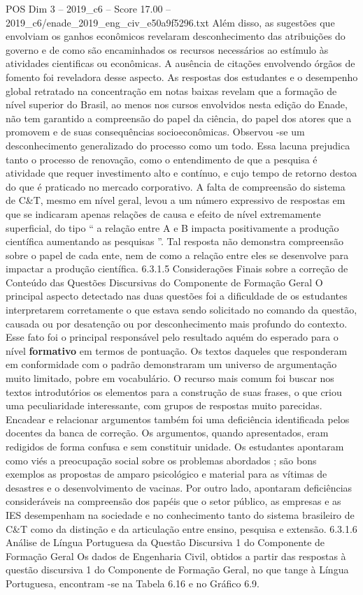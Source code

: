 \begin{textsample}{POS Dim 3 – 2019\_c6 – Score 17.00 – 2019\_c6/enade\_2019\_eng\_civ\_e50a9f5296.txt}
Além disso, as sugestões que envolviam os ganhos econômicos revelaram desconhecimento das atribuições do governo e de como são encaminhados os recursos necessários ao estímulo às atividades cientificas ou econômicas.
A ausência de citações envolvendo órgãos de fomento foi reveladora desse aspecto.
As respostas dos estudantes e o desempenho global retratado na concentração em notas baixas revelam que a formação de nível superior do Brasil, ao menos nos cursos envolvidos nesta edição do Enade, não tem garantido a compreensão do papel da ciência, do papel dos atores que a promovem e de suas consequências socioeconômicas.
Observou -se um desconhecimento generalizado do processo como um todo.
Essa lacuna prejudica tanto o processo de renovação, como o entendimento de que a pesquisa é atividade que requer investimento alto e contínuo, e cujo tempo de retorno destoa do que é praticado no mercado corporativo.
A falta de compreensão do sistema de C\&T, mesmo em nível geral, levou a um número expressivo de respostas em que se indicaram apenas relações de causa e efeito de nível extremamente superficial, do tipo “ a relação entre A e B impacta positivamente a produção científica aumentando as pesquisas ”.
Tal resposta não demonstra compreensão sobre o papel de cada ente, nem de como a relação entre eles se desenvolve para impactar a produção científica. 6.3.1.5 Considerações Finais sobre a correção de Conteúdo das Questões Discursivas do Componente de Formação Geral O principal aspecto detectado nas duas questões foi a dificuldade de os estudantes interpretarem corretamente o que estava sendo solicitado no comando da questão, causada ou por desatenção ou por desconhecimento mais profundo do contexto.
Esse fato foi o principal responsável pelo resultado aquém do esperado para o nível \textbf{formativo} em termos de pontuação.
Os textos daqueles que responderam em conformidade com o padrão demonstraram um universo de argumentação muito limitado, pobre em vocabulário.
O recurso mais comum foi buscar nos textos introdutórios os elementos para a construção de suas frases, o que criou uma peculiaridade interessante, com grupos de respostas muito parecidas.
Encadear e relacionar argumentos também foi uma deficiência identificada pelos docentes da banca de correção.
Os argumentos, quando apresentados, eram redigidos de forma confusa e sem constituir unidade.
Os estudantes apontaram como viés a preocupação social sobre os problemas abordados ; são bons exemplos as propostas de amparo psicológico e material para as vítimas de desastres e o desenvolvimento de vacinas.
Por outro lado, apontaram deficiências consideráveis na compreensão dos papéis que o setor público, as empresas e as IES desempenham na sociedade e no conhecimento tanto do sistema brasileiro de C\&T como da distinção e da articulação entre ensino, pesquisa e extensão. 6.3.1.6 Análise de Língua Portuguesa da Questão Discursiva 1 do Componente de Formação Geral Os dados de Engenharia Civil, obtidos a partir das respostas à questão discursiva 1 do Componente de Formação Geral, no que tange à Língua Portuguesa, encontram -se na Tabela 6.16 e no Gráfico 6.9.

\end{textsample}
